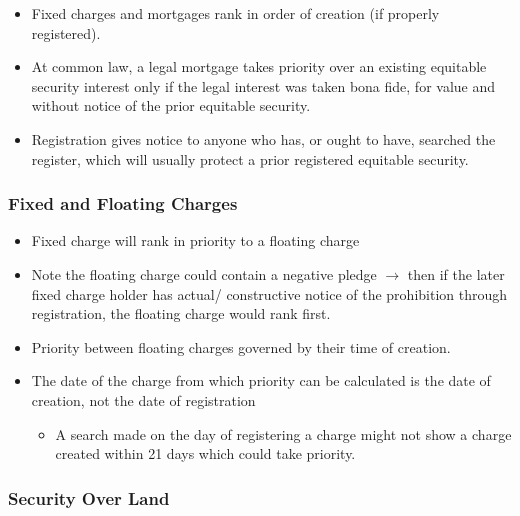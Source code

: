 \documentclass[
]{article}
\providecommand{\tightlist}{%
  \setlength{\itemsep}{0pt}\setlength{\parskip}{0pt}}
\begin{document}
\begin{itemize}
\tightlist
\item
  Fixed charges and mortgages rank in order of creation (if properly
  registered).
\item
  At common law, a legal mortgage takes priority over an existing
  equitable security interest only if the legal interest was taken bona
  fide, for value and without notice of the prior equitable security.
\item
  Registration gives notice to anyone who has, or ought to have,
  searched the register, which will usually protect a prior registered
  equitable security.
\end{itemize}

\hypertarget{fixed-and-floating-charges}{%
\subsubsection{Fixed and Floating
Charges}\label{fixed-and-floating-charges}}

\begin{itemize}
\tightlist
\item
  Fixed charge will rank in priority to a floating charge
\item
  Note the floating charge could contain a negative pledge
  \(\rightarrow\) then if the later fixed charge holder has actual/
  constructive notice of the prohibition through registration, the
  floating charge would rank first.
\item
  Priority between floating charges governed by their time of creation.
\item
  The date of the charge from which priority can be calculated is the
  date of creation, not the date of registration

  \begin{itemize}
  \tightlist
  \item
    A search made on the day of registering a charge might not show a
    charge created within 21 days which could take priority.
  \end{itemize}
\end{itemize}

\hypertarget{security-over-land}{%
\subsubsection{Security Over Land}\label{security-over-land}}
\end{document}

